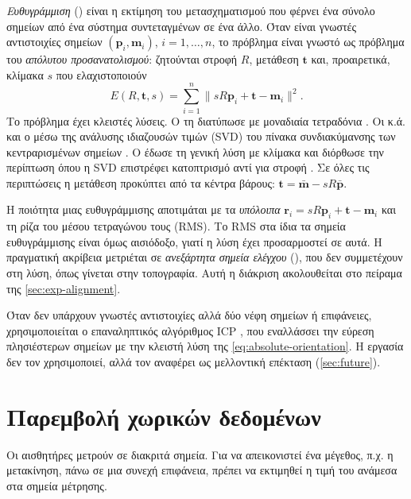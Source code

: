 \emph{Ευθυγράμμιση} () είναι η εκτίμηση του μετασχηματισμού που φέρνει ένα σύνολο σημείων από ένα σύστημα συντεταγμένων σε ένα άλλο. Όταν είναι γνωστές αντιστοιχίες σημείων $(\mathbf{p}_i, \mathbf{m}_i)$, $i = 1, \dots, n$, το πρόβλημα είναι γνωστό ως πρόβλημα του \emph{απόλυτου προσανατολισμού}: ζητούνται στροφή $R$, μετάθεση $\mathbf{t}$ και, προαιρετικά, κλίμακα $s$ που ελαχιστοποιούν
\begin{equation}
  E(R, \mathbf{t}, s) = \sum_{i=1}^{n} \lVert s R \mathbf{p}_i + \mathbf{t} - \mathbf{m}_i \rVert^2 .
  \label{eq:absolute-orientation}
\end{equation}
Το πρόβλημα έχει κλειστές λύσεις. Ο  τη διατύπωσε με μοναδιαία τετραδόνια \cite{horn1987closed}. Οι  κ.ά. και ο  μέσω της ανάλυσης ιδιαζουσών τιμών (SVD) του πίνακα συνδιακύμανσης των κεντραρισμένων σημείων \cite{arun1987leastsquares,kabsch1976solution}. Ο  έδωσε τη γενική λύση με κλίμακα και διόρθωσε την περίπτωση όπου η SVD επιστρέφει κατοπτρισμό αντί για στροφή \cite{umeyama1991leastsquares}. Σε όλες τις περιπτώσεις η μετάθεση προκύπτει από τα κέντρα βάρους: $\mathbf{t} = \bar{\mathbf{m}} - sR\bar{\mathbf{p}}$.

Η ποιότητα μιας ευθυγράμμισης αποτιμάται με τα \emph{υπόλοιπα} $\mathbf{r}_i = sR\mathbf{p}_i + \mathbf{t} - \mathbf{m}_i$ και τη ρίζα του μέσου τετραγώνου τους (RMS). Το RMS στα ίδια τα σημεία ευθυγράμμισης είναι όμως αισιόδοξο, γιατί η λύση έχει προσαρμοστεί σε αυτά. Η πραγματική ακρίβεια μετριέται σε \emph{ανεξάρτητα σημεία ελέγχου} (), που δεν συμμετέχουν στη λύση, όπως γίνεται στην τοπογραφία. Αυτή η διάκριση ακολουθείται στο πείραμα της \cref{sec:exp-alignment}.

Όταν δεν υπάρχουν γνωστές αντιστοιχίες αλλά δύο νέφη σημείων ή επιφάνειες, χρησιμοποιείται ο επαναληπτικός αλγόριθμος ICP \cite{besl1992icp}, που εναλλάσσει την εύρεση πλησιέστερων σημείων με την κλειστή λύση της \cref{eq:absolute-orientation}. Η εργασία δεν τον χρησιμοποιεί, αλλά τον αναφέρει ως μελλοντική επέκταση (\cref{sec:future}).

\section{Παρεμβολή χωρικών δεδομένων}
\label{sec:bg-interpolation}

Οι αισθητήρες μετρούν σε διακριτά σημεία. Για να απεικονιστεί ένα μέγεθος, π.χ. η μετακίνηση, πάνω σε μια συνεχή επιφάνεια, πρέπει να εκτιμηθεί η τιμή του ανάμεσα στα σημεία μέτρησης.

